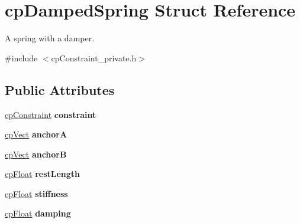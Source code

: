 \hypertarget{structcp_damped_spring}{}\section{cp\+Damped\+Spring Struct Reference}
\label{structcp_damped_spring}


A spring with a damper.  




{\ttfamily \#include $<$cp\+Constraint\+\_\+private.\+h$>$}

\subsection*{Public Attributes}
\begin{DoxyCompactItemize}
\item 
\hypertarget{structcp_damped_spring_aa24b79f6ccfa5b0891fe3092752888be}{}\hyperlink{structcp_constraint}{cp\+Constraint} {\bfseries constraint}\label{structcp_damped_spring_aa24b79f6ccfa5b0891fe3092752888be}

\item 
\hypertarget{structcp_damped_spring_afda1e8a59f2cd95c3faaa9411d252e9d}{}\hyperlink{structcp_vect}{cp\+Vect} {\bfseries anchor\+A}\label{structcp_damped_spring_afda1e8a59f2cd95c3faaa9411d252e9d}

\item 
\hypertarget{structcp_damped_spring_a9c8f67e034e3c83b348d32ba2f4f0025}{}\hyperlink{structcp_vect}{cp\+Vect} {\bfseries anchor\+B}\label{structcp_damped_spring_a9c8f67e034e3c83b348d32ba2f4f0025}

\item 
\hypertarget{structcp_damped_spring_ab61ca07cbe0ddd6f4379eb1fe364fa8b}{}\hyperlink{group__basic_types_gac1ed65573e035bf892505768c852d8d3}{cp\+Float} {\bfseries rest\+Length}\label{structcp_damped_spring_ab61ca07cbe0ddd6f4379eb1fe364fa8b}

\item 
\hypertarget{structcp_damped_spring_a6d40b21dc0ca0a57aecec6c517850f5f}{}\hyperlink{group__basic_types_gac1ed65573e035bf892505768c852d8d3}{cp\+Float} {\bfseries stiffness}\label{structcp_damped_spring_a6d40b21dc0ca0a57aecec6c517850f5f}

\item 
\hypertarget{structcp_damped_spring_ac337d660f55f223ab0a1171ae630a0f2}{}\hyperlink{group__basic_types_gac1ed65573e035bf892505768c852d8d3}{cp\+Float} {\bfseries damping}\label{structcp_damped_spring_ac337d660f55f223ab0a1171ae630a0f2}


\end{DoxyCompactItemize}
